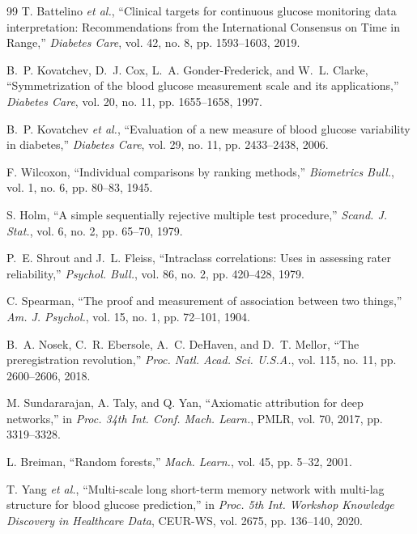 \documentclass[journal]{IEEEtran}
\begin{document}
\begin{thebibliography}{99}
\label{ref52label} T. Battelino \emph{et al.}, ``Clinical targets for continuous glucose monitoring data interpretation: Recommendations from the International Consensus on Time in Range,'' \emph{Diabetes Care}, vol. 42, no. 8, pp. 1593--1603, 2019.

\label{ref46label} B.~P. Kovatchev, D.~J. Cox, L.~A. Gonder-Frederick, and W.~L. Clarke, ``Symmetrization of the blood glucose measurement scale and its applications,'' \emph{Diabetes Care}, vol. 20, no. 11, pp. 1655--1658, 1997.

\label{ref47label} B.~P. Kovatchev \emph{et al.}, ``Evaluation of a new measure of blood glucose variability in diabetes,'' \emph{Diabetes Care}, vol. 29, no. 11, pp. 2433--2438, 2006.

\label{ref48label} F. Wilcoxon, ``Individual comparisons by ranking methods,'' \emph{Biometrics Bull.}, vol. 1, no. 6, pp. 80--83, 1945.

\label{ref49label} S. Holm, ``A simple sequentially rejective multiple test procedure,'' \emph{Scand. J. Stat.}, vol. 6, no. 2, pp. 65--70, 1979.

\label{ref50label} P.~E. Shrout and J.~L. Fleiss, ``Intraclass correlations: Uses in assessing rater reliability,'' \emph{Psychol. Bull.}, vol. 86, no. 2, pp. 420--428, 1979.

\label{ref51label} C. Spearman, ``The proof and measurement of association between two things,'' \emph{Am. J. Psychol.}, vol. 15, no. 1, pp. 72--101, 1904.

\label{ref79label} B.~A. Nosek, C.~R. Ebersole, A.~C. DeHaven, and D.~T. Mellor, ``The preregistration revolution,'' \emph{Proc. Natl. Acad. Sci. U.S.A.}, vol. 115, no. 11, pp. 2600--2606, 2018.

\label{ref54label} M. Sundararajan, A. Taly, and Q. Yan, ``Axiomatic attribution for deep networks,'' in \emph{Proc. 34th Int. Conf. Mach. Learn.}, PMLR, vol. 70, 2017, pp. 3319--3328.

\label{ref55label} L. Breiman, ``Random forests,'' \emph{Mach. Learn.}, vol. 45, pp. 5--32, 2001.

\label{ref64label} T. Yang \emph{et al.}, ``Multi-scale long short-term memory network with multi-lag structure for blood glucose prediction,'' in \emph{Proc. 5th Int. Workshop Knowledge Discovery in Healthcare Data}, CEUR-WS, vol. 2675, pp. 136--140, 2020.


\end{thebibliography}
\end{document}
